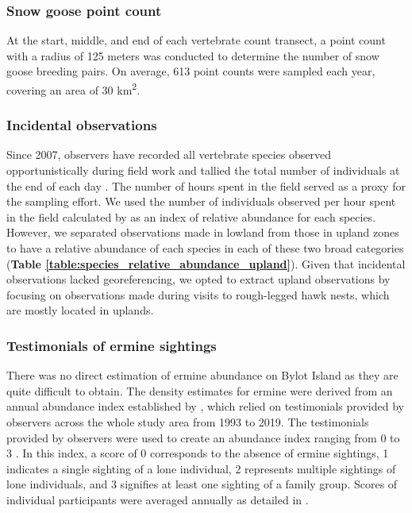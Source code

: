 \documentclass[a4paper,twoside,10pt]{article}
\begin{document}
\subsubsection{Snow goose point count}
At the start, middle, and end of each vertebrate count transect, a point count with a radius of 125 meters was conducted to determine the number of snow goose breeding pairs. On average, 613  point counts were sampled each year, covering an area of 30  km\textsuperscript{2}.

\subsubsection{Incidental observations}
Since 2007, observers have recorded all vertebrate species observed opportunistically during field work and tallied the total number of individuals at the end of each day \citep{gauthier2020daily, gauthier2024a}. The number of hours spent in the field served as a proxy for the sampling effort. We used the number of individuals observed per hour spent in the field calculated by \citet{gauthier2024a} as an index of relative abundance for each species. However, we separated observations made in lowland from those in upland zones to have a relative abundance of each species in each of these two broad categories (\textbf{Table \ref{table:species_relative_abundance_upland}}). Given that incidental observations lacked georeferencing, we opted to extract upland observations by focusing on observations made during visits to rough-legged hawk nests, which are mostly located in uplands. 


\newpage

\subsubsection{Testimonials of ermine sightings}
There was no direct estimation of ermine abundance on Bylot Island as they are quite difficult to obtain. The density estimates for ermine were derived from an annual abundance index established by \citet{bolduc2023}, which relied on testimonials provided by observers across the whole study area from 1993 to 2019. The testimonials provided by observers were used to create an abundance index ranging from 0 to 3 \citep{bolduc2023}. In this index, a score of 0 corresponds to the absence of ermine sightings, 1 indicates a single sighting of a lone individual, 2 represents multiple sightings of lone individuals, and 3 signifies at least one sighting of a family group. Scores of individual participants were averaged annually as detailed in \citet{bolduc2023}. 
\end{document}
